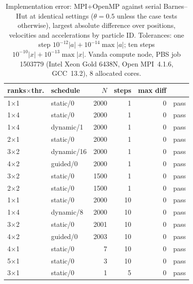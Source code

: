 \begin{table}[t]
\centering\small
\caption{Implementation error: MPI+OpenMP against serial Barnes--Hut at identical settings ($\theta=0.5$ unless the case tests otherwise), largest absolute difference over positions, velocities and accelerations by particle ID. Tolerances: one step $10^{-12}|a|+10^{-14}\max|a|$; ten steps $10^{-10}|x|+10^{-13}\max|x|$. Vanda compute node, PBS job 1503779 (Intel Xeon Gold 6438N, Open MPI~4.1.6, GCC~13.2), 8 allocated cores.}
\label{tab:hybrid}
\setlength{\tabcolsep}{4pt}
\begin{tabular}{llrrrl}
\hline
ranks$\times$thr. & schedule & $N$ & steps & max diff & \\
\hline
1$\times$1 & static/0 & 2000 & 1 & 0 & pass \\
1$\times$4 & static/0 & 2000 & 1 & 0 & pass \\
1$\times$4 & dynamic/1 & 2000 & 1 & 0 & pass \\
2$\times$1 & static/0 & 2000 & 1 & 0 & pass \\
3$\times$2 & dynamic/16 & 2000 & 1 & 0 & pass \\
4$\times$2 & guided/0 & 2000 & 1 & 0 & pass \\
3$\times$2 & static/0 & 1500 & 1 & 0 & pass \\
2$\times$2 & static/0 & 1500 & 1 & 0 & pass \\
1$\times$1 & static/0 & 2000 & 10 & 0 & pass \\
1$\times$4 & dynamic/8 & 2000 & 10 & 0 & pass \\
3$\times$2 & static/0 & 2001 & 10 & 0 & pass \\
4$\times$2 & guided/0 & 2003 & 10 & 0 & pass \\
4$\times$1 & static/0 & 7 & 10 & 0 & pass \\
5$\times$1 & static/0 & 3 & 10 & 0 & pass \\
3$\times$1 & static/0 & 1 & 5 & 0 & pass \\
\hline
\end{tabular}
\end{table}
